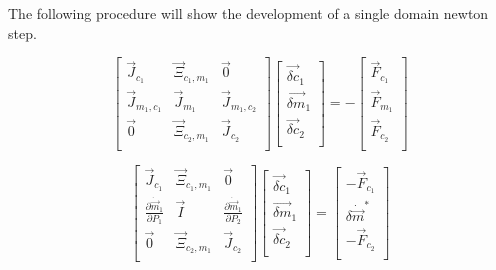 
The following procedure will show the development of a single domain newton step.

\begin{equation}
\label{eqn:domainMatrix}
 \begin{bmatrix} 
\vec{J}_{c_1} & \vec{\Xi}_{c_1,m_1} & \vec{0} \\
\vec{J}_{m_1,c_1} & \vec{J}_{m_1} & \vec{J}_{m_1,c_2}  \\
\vec{0} & \vec{\Xi}_{c_2,m_1} & \vec{J}_{c_2} \\
 \end{bmatrix} \begin{bmatrix}
 \vec{\delta c}_{1} \\
 \vec{\delta m}_{1} \\
 \vec{\delta c}_{2} \\
\end{bmatrix}  = -\begin{bmatrix}
 \vec{F}_{c_1} \\
 \vec{F}_{m_1} \\
 \vec{F}_{c_2} \\
\end{bmatrix}
 \end{equation}
 
 \begin{equation}
\label{eqn:domainMatrix2}
 \begin{bmatrix} 
\vec{J}_{c_1} & \vec{\Xi}_{c_1,m_1} & \vec{0} \\
\frac{\partial \dot{\vec{m}}_{1}}{\partial P_{1} } & \vec{I} & \frac{\partial \dot{\vec{m}}_{1}}{\partial P_{2} }  \\
\vec{0} & \vec{\Xi}_{c_2,m_1} & \vec{J}_{c_2} \\
 \end{bmatrix} \begin{bmatrix}
 \vec{\delta c}_{1} \\
 \vec{\delta m}_{1} \\
 \vec{\delta c}_{2} \\
\end{bmatrix}  = \begin{bmatrix}
 - \vec{F}_{c_1} \\
 \delta \dot{\vec{m}}^{*} \\
 - \vec{F}_{c_2} \\
\end{bmatrix}
 \end{equation}
 
